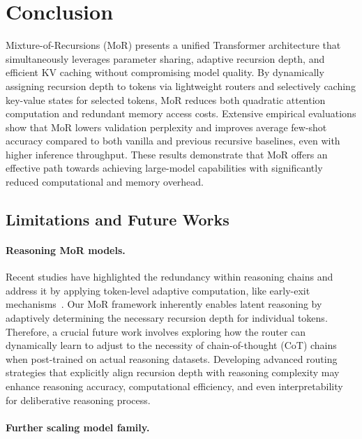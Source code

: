 \section{Conclusion}

Mixture-of-Recursions (MoR) presents a unified Transformer architecture that simultaneously leverages parameter sharing, adaptive recursion depth, and efficient KV caching without compromising model quality. 
By dynamically assigning recursion depth to tokens via lightweight routers and selectively caching key-value states for selected tokens, MoR reduces both quadratic attention computation and redundant memory access costs.
Extensive empirical evaluations show that MoR lowers validation perplexity and improves average few-shot accuracy compared to both vanilla and previous recursive baselines, even with higher inference throughput.
These results demonstrate that MoR offers an effective path towards achieving large-model capabilities with significantly reduced computational and memory overhead.



\subsection{Limitations and Future Works}


\paragraph{Reasoning MoR models.}
Recent studies have highlighted the redundancy within reasoning chains and address it by applying token-level adaptive computation, like early-exit mechanisms~\citep{yang2025dynamic, jiang2025flashthink, dai2025s}. Our MoR framework inherently enables latent reasoning by adaptively determining the necessary recursion depth for individual tokens. Therefore, a crucial future work involves exploring how the router can dynamically learn to adjust to the necessity of chain-of-thought (CoT) chains when post-trained on actual reasoning datasets. Developing advanced routing strategies that explicitly align recursion depth with reasoning complexity may enhance reasoning accuracy, computational efficiency, and even interpretability for deliberative reasoning process.



\vspace{-12pt}
\paragraph{Further scaling model family.}

